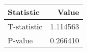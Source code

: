 \begin{tabular}{lr}
\toprule
Statistic & Value \\
\midrule
T-statistic & 1.114563 \\
P-value & 0.266410 \\
\bottomrule
\end{tabular}

